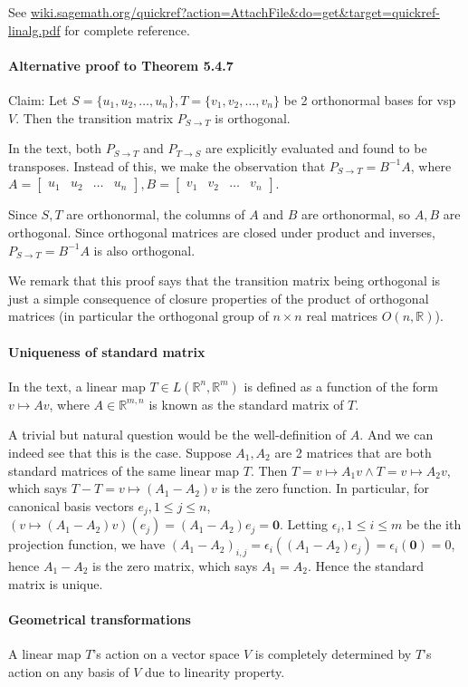 \documentclass{article}
\newcommand{\colMat}[2]{\begin{bmatrix}
	{#1}_1 & {#1}_2 & \dots & {#1}_{#2}
\end{bmatrix}}
\newcommand{\indexedSet}[2]{\{#1_1,#1_2,\dots,#1_#2\}}
\begin{document}
See \url{wiki.sagemath.org/quickref?action=AttachFile&do=get&target=quickref-linalg.pdf} for complete reference.

\paragraph{Alternative proof to Theorem 5.4.7} Claim: Let $S=\indexedSet{u}{n},T=\indexedSet{v}{n}$ be 2 orthonormal bases for vsp $V$. Then the transition matrix $P_{S\rightarrow T}$ is orthogonal.

In the text, both $P_{S\rightarrow T}$ and $P_{T\rightarrow S}$ are explicitly evaluated and found to be transposes. Instead of this, we make the observation that $P_{S\rightarrow T} = B^{-1}A$, where $A = \colMat{u}{n}, B=\colMat{v}{n}$.

Since $S, T$ are orthonormal, the columns of $A$ and $B$ are orthonormal, so $A, B$ are orthogonal. Since orthogonal matrices are closed under product and inverses, $P_{S\rightarrow T} = B^{-1}A$ is also orthogonal.

We remark that this proof says that the transition matrix being orthogonal is just a simple consequence of closure properties of the product of orthogonal matrices (in particular the orthogonal group of $n\times n$ real matrices $O(n, \mathbb{R})$).

\paragraph{Uniqueness of standard matrix} In the text, a linear map $T\in L(\mathbb{R}^n, \mathbb{R}^m)$ is defined as a function of the form $v\mapsto Av$, where $A\in \mathbb{R}^{m,n}$ is known as the standard matrix of $T$.

A trivial but natural question would be the well-definition of $A$. And we can indeed see that this is the case. Suppose $A_1, A_2$ are 2 matrices that are both standard matrices of the same linear map $T$. Then $T=v\mapsto A_1v\land T=v\mapsto A_2v$, which says $T-T = v\mapsto (A_1-A_2)v$ is the zero function. In particular, for canonical basis vectors $e_j, 1\leq j\leq n$, $(v\mapsto (A_1-A_2)v)(e_j) = (A_1-A_2)e_j = \mathbf{0}$. Letting $\epsilon_i, 1\leq i\leq m$ be the ith projection function, we have $(A_1-A_2)_{i,j} = \epsilon_i((A_1-A_2)e_j) = \epsilon_i(\mathbf{0}) = 0$, hence $A_1-A_2$ is the zero matrix, which says $A_1=A_2$. Hence the standard matrix is unique.

\paragraph{Geometrical transformations} A linear map $T$'s action on a vector space $V$ is completely determined by $T$'s action on any basis of $V$ due to linearity property.
\end{document}
